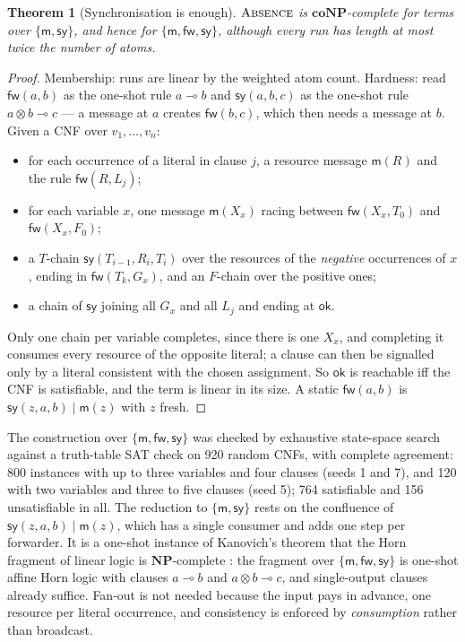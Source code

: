 \documentclass[11pt]{article}
\theoremstyle{definition}
\theoremstyle{plain}
\newtheorem{theorem}[definition]{Theorem}
\theoremstyle{remark}
\newcommand{\ok}{\mathsf{ok}}
\newcommand{\ABS}{\textup{\textsc{Absence}}}
\newcommand{\NPclass}{\mathbf{NP}}
\newcommand{\coNP}{\mathbf{coNP}}
\newcommand{\cm}{\mathsf{m}}
\newcommand{\cfw}{\mathsf{fw}}
\newcommand{\csy}{\mathsf{sy}}
\begin{document}
\begin{theorem}[Synchronisation is enough]\label{thm:sy}
$\ABS$ is $\coNP$-complete for terms over $\{\cm, \csy\}$, and hence for
$\{\cm, \cfw, \csy\}$, although every run has length at most twice the
number of atoms.
\end{theorem}

\begin{proof}
Membership: runs are linear by the weighted atom count. Hardness: read
$\cfw(a,b)$ as the one-shot rule $a \multimap b$ and $\csy(a,b,c)$ as the
one-shot rule $a \otimes b \multimap c$ --- a message at $a$ creates
$\cfw(b,c)$, which then needs a message at $b$. Given a CNF over
$v_1,\dots,v_n$:
\begin{itemize}
\item for each occurrence of a literal in clause $j$, a resource message
$\cm(R)$ and the rule $\cfw(R, L_j)$;
\item for each variable $x$, one message $\cm(X_x)$ racing between
$\cfw(X_x, T_0)$ and $\cfw(X_x, F_0)$;
\item a $T$-chain $\csy(T_{i-1}, R_i, T_i)$ over the resources of the
\emph{negative} occurrences of $x$, ending in $\cfw(T_k, G_x)$, and an
$F$-chain over the positive ones;
\item a chain of $\csy$ joining all $G_x$ and all $L_j$ and ending at
$\ok$.
\end{itemize}
Only one chain per variable completes, since there is one $X_x$, and
completing it consumes every resource of the opposite literal; a clause
can then be signalled only by a literal consistent with the chosen
assignment. So $\ok$ is reachable iff the CNF is satisfiable, and the term
is linear in its size. A static $\cfw(a,b)$ is $\csy(z,a,b) \mid \cm(z)$
with $z$ fresh.
\end{proof}

The construction over $\{\cm, \cfw, \csy\}$ was checked by exhaustive
state-space search against a truth-table SAT check on 920 random CNFs,
with complete agreement: 800 instances with up to three variables and
four clauses (seeds 1 and 7), and 120 with two variables and three to
five clauses (seed 5); 764 satisfiable and 156 unsatisfiable in all. The
reduction to $\{\cm, \csy\}$ rests on the confluence of $\csy(z,a,b) \mid
\cm(z)$, which has a single consumer and adds one step per forwarder. It is a one-shot instance of Kanovich's theorem that the Horn
fragment of linear logic is $\NPclass$-complete \cite{Kanovich92}: the
fragment over $\{\cm, \cfw, \csy\}$ is one-shot affine Horn logic with
clauses $a \multimap b$ and $a \otimes b \multimap c$, and single-output
clauses already suffice. Fan-out is not needed because the input pays in
advance, one resource per literal occurrence, and consistency is enforced
by \emph{consumption} rather than broadcast.
\end{document}
